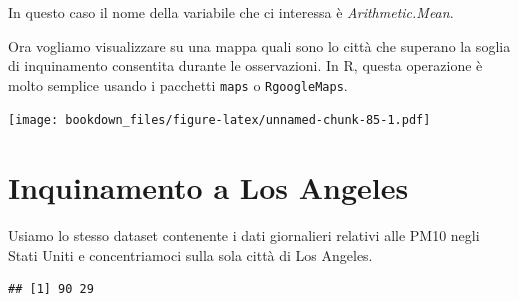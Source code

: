\documentclass[]{book}
\newenvironment{Shaded}{\begin{snugshade}}{\end{snugshade}}
\newcommand{\CommentTok}[1]{\textcolor[rgb]{0.56,0.35,0.01}{\textit{#1}}}
\newcommand{\DataTypeTok}[1]{\textcolor[rgb]{0.13,0.29,0.53}{#1}}
\newcommand{\DecValTok}[1]{\textcolor[rgb]{0.00,0.00,0.81}{#1}}
\newcommand{\FloatTok}[1]{\textcolor[rgb]{0.00,0.00,0.81}{#1}}
\newcommand{\KeywordTok}[1]{\textcolor[rgb]{0.13,0.29,0.53}{\textbf{#1}}}
\newcommand{\NormalTok}[1]{#1}
\newcommand{\OperatorTok}[1]{\textcolor[rgb]{0.81,0.36,0.00}{\textbf{#1}}}
\newcommand{\StringTok}[1]{\textcolor[rgb]{0.31,0.60,0.02}{#1}}
\begin{document}
In questo caso il nome della variabile che ci interessa è \emph{Arithmetic.Mean}.

Ora vogliamo visualizzare su una mappa quali sono lo città che superano la soglia di inquinamento consentita durante le osservazioni. In R, questa operazione è molto semplice usando i pacchetti \texttt{maps} o \texttt{RgoogleMaps}.

\begin{Shaded}
\end{Shaded}

\texttt{[image: bookdown\_files/figure-latex/unnamed-chunk-85-1.pdf]}

\hypertarget{inquinamento-a-los-angeles}{%
\section{Inquinamento a Los Angeles}\label{inquinamento-a-los-angeles}}

Usiamo lo stesso dataset contenente i dati giornalieri relativi alle PM10 negli Stati Uniti e concentriamoci sulla sola città di Los Angeles.

\begin{Shaded}
\end{Shaded}

\begin{verbatim}
## [1] 90 29
\end{verbatim}
\end{document}
